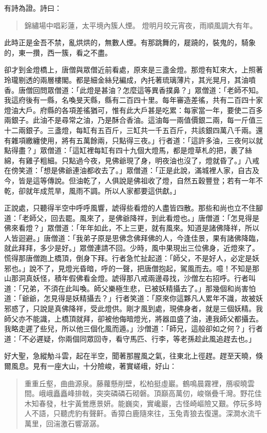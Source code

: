 有詩為證。詩曰：
\begin{quote}
錦繡場中唱彩蓮，太平境內簇人煙。
燈明月皎元宵夜，雨順風調大有年。
\end{quote}

此時正是金吾不禁，亂烘烘的，無數人煙。有那跳舞的，屣蹺的，裝鬼的，騎象的，東一攢，西一簇，看之不盡。

卻才到金燈橋上，唐僧與眾僧近前看處，原來是三盞金燈。那燈有缸來大，上照著玲瓏剔透的兩層樓閣。都是細金絲兒編成，內托著琉璃薄片，其光晃月，其油噴香。唐僧回問眾僧道：「此燈是甚油？怎麼這等異香撲鼻？」眾僧道：「老師不知。我這府後有一縣，名喚旻天縣，縣有二百四十里。每年審造差徭，共有二百四十家燈油大戶。府縣的各項差徭猶可，惟有此大戶甚是吃累：每家當一年，要使二百多兩銀子。此油不是尋常之油，乃是酥合香油。這油每一兩值價銀二兩，每一斤值三十二兩銀子。三盞燈，每缸有五百斤，三缸共一千五百斤，共該銀四萬八千兩。還有雜項繳纏使用，將有五萬餘兩，只點得三夜。」行者道：「這許多油，三夜何以就點得盡？」眾僧道：「這缸裡每缸有四十九個大燈馬，都是燈草札的把，裹了絲綿，有雞子粗細。只點過今夜，見佛爺現了身，明夜油也沒了，燈就昏了。」八戒在傍笑道：「想是佛爺連油都收去了。」眾僧道：「正是此說，滿城裡人家，自古及今，皆是這等傳說。但油乾了，人俱說是佛祖收了燈，自然五穀豐登；若有一年不乾，卻就年成荒旱，風雨不調。所以人家都要這供獻。」

正說處，只聽得半空中呼呼風響，諕得些看燈的人盡皆四散。那些和尚也立不住腳道：「老師父，回去罷。風來了，是佛爺降祥，到此看燈也。」唐僧道：「怎見得是佛來看燈？」眾僧道：「年年如此，不上三更，就有風來。知道是諸佛降祥，所以人皆迴避。」唐僧道：「我弟子原是思佛念佛拜佛的人，今逢佳景，果有諸佛降臨，就此拜拜，多少是好。」眾僧連請不回。少時，風中果現出三位佛身，近燈來了。慌得那唐僧跑上橋頂，倒身下拜。行者急忙扯起道：「師父，不是好人，必定是妖邪也。」說不了，見燈光昏暗，呼的一聲，把唐僧抱起，駕風而去。噫！不知是那山那洞真妖怪，積年假佛看金燈。諕得那八戒兩邊尋找，沙僧左右招呼。行者叫道：「兄弟，不須在此叫喚。師父樂極生悲，已被妖精攝去了。」那幾個和尚害怕道：「爺爺，怎見得是妖精攝去？」行者笑道：「原來你這夥凡人累年不識，故被妖邪惑了，只說是真佛降祥，受此燈供。剛才風到處，現佛身者，就是三個妖精。我師父亦不能識，上橋頂就拜，卻被他侮暗燈光，將器皿盛了油，連我師父都攝去。我略走遲了些兒，所以他三個化風而遁。」沙僧道：「師兄，這般卻如之何？」行者道：「不必遲疑，你兩個同眾回寺，看守馬匹、行李，等老孫趁此風追趕去也。」

好大聖，急縱觔斗雲，起在半空，聞著那腥風之氣，往東北上徑趕。趕至天曉，倏爾風息。見有一座大山，十分險峻，著實嵯峨，好山：
\begin{quote}
重重丘壑，曲曲源泉。藤蘿懸削壁，松柏挺虛巖。鶴鳴晨霧裡，鴈唳曉雲間。峨峨矗矗峰排戟，突突磷磷石砌磐。頂巔高萬仞，峻嶺疊千灣。野花佳木知春發，杜宇黃鶯應景妍。能巍奕，實巉巖，古怪崎嶇險又艱。停玩多時人不語，只聽虎豹有聲鼾。香獐白鹿隨來往，玉兔青狼去復還。深澗水流千萬里，回湍激石響潺潺。
\end{quote}

